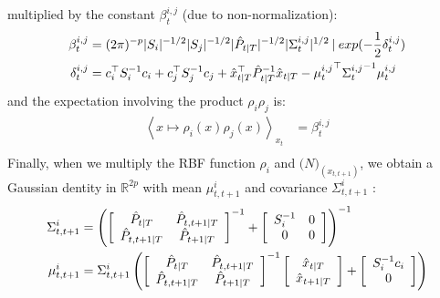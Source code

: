 multiplied by the constant $\beta^{i,j}_t$ (due to non-normalization):
\begin{align*}
  \beta^{i,j}_t &= (2\pi)^{-p} |S_i|^{-1/2} |S_j|^{-1/2} |\hat{P}_{t|T}|^{-1/2} |\Sigma^{i,j}_t|^{1/2}\mathbin{\vert} exp(-\frac{1}{2} \delta^{i,j}_t)\\
  \delta^{i,j}_t &= c_i^{\top} S_i^{-1} c_i + c_j^{\top} S_j^{-1} c_j + \hat{x}_{t \mathbin{\vert} T}^{\top} \hat{P}_{t \mathbin{\vert} T}^{-1} \hat{x}_{t \mathbin{\vert} T} - {\mu^{i,j}_t}^{\top} {\Sigma^{i,j}_t}^{-1} \mu^{i,j}_t\\
\end{align*}
and the expectation involving the product $\rho_i \rho_j$ is:
\begin{align*}
  \left< x \mapsto \rho_i(x)\rho_j(x)\right>_{x_t} &= \beta^{i,j}_t\\
\end{align*}
Finally, when we multiply the RBF function $\rho_i$ and $\mathcal(N)_{(x_{t,t+1})}$, we obtain a Gaussian dentity in $\mathbb{R}^{2p}$ with mean $\mu^i_{t,t+1}$ and covariance $\Sigma^i_{t,t+1}$ :
\begin{align*}
  \Sigma^i_{t,t+1} &=
    \left(
      \left[
        \begin{array}{cc} \hat{P}_{t \mathbin{\vert} T} & \hat{P}_{t,t+1 \mathbin{\vert} T}\\ \hat{P}_{t,t+1 \mathbin{\vert} T} & \hat{P}_{t+1 \mathbin{\vert} T} \end{array}
      \right]^{-1}
       +
      \left[
        \begin{array}{cc} S_i^{-1} & 0\\ 0 & 0 \end{array}
      \right]
    \right)^{-1}
  \\
  \mu^i_{t,t+1} &= \Sigma^i_{t,t+1}
    \left(
      \left[
        \begin{array}{cc} \hat{P}_{t \mathbin{\vert} T} & \hat{P}_{t,t+1 \mathbin{\vert} T}\\ \hat{P}_{t,t+1 \mathbin{\vert} T} & \hat{P}_{t+1 \mathbin{\vert} T} \end{array}
      \right]^{-1}
      \left[
        \begin{array}{c} \hat{x}_{t \mathbin{\vert} T} \\ \hat{x}_{t+1 \mathbin{\vert} T} \end{array}
      \right] +
      \left[
        \begin{array}{c} S_i^{-1}c_i \\ 0 \end{array}
      \right]
    \right)
  \\
\end{align*}
